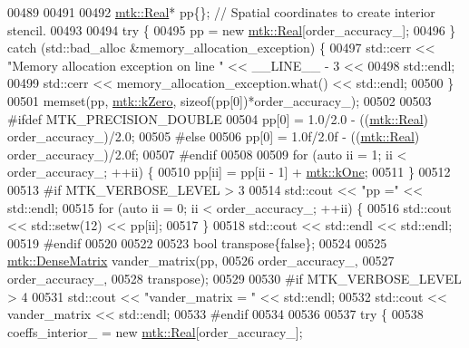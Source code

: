 \begin{DoxyCode}
{{00489 
00491 
00492   \hyperlink{group__c01-roots_gac080bbbf5cbb5502c9f00405f894857d}{mtk::Real}* pp\{\}; \textcolor{comment}{// Spatial coordinates to create interior stencil.}
00493 
00494   \textcolor{keywordflow}{try} \{
00495     pp = \textcolor{keyword}{new} \hyperlink{group__c01-roots_gac080bbbf5cbb5502c9f00405f894857d}{mtk::Real}[order\_accuracy\_];
00496   \} \textcolor{keywordflow}{catch} (std::bad\_alloc &memory\_allocation\_exception) \{
00497     std::cerr << \textcolor{stringliteral}{"Memory allocation exception on line "} << \_\_LINE\_\_ - 3 <<
00498       std::endl;
00499     std::cerr << memory\_allocation\_exception.what() << std::endl;
00500   \}
00501   memset(pp, \hyperlink{group__c01-roots_ga59a451a5fae30d59649bcda274fea271}{mtk::kZero}, \textcolor{keyword}{sizeof}(pp[0])*order\_accuracy\_);
00502 
00503 \textcolor{preprocessor}{  #ifdef MTK\_PRECISION\_DOUBLE}
00504   pp[0] = 1.0/2.0 - ((\hyperlink{group__c01-roots_gac080bbbf5cbb5502c9f00405f894857d}{mtk::Real}) order\_accuracy\_)/2.0;
00505 \textcolor{preprocessor}{  #else}
00506   pp[0] = 1.0f/2.0f - ((\hyperlink{group__c01-roots_gac080bbbf5cbb5502c9f00405f894857d}{mtk::Real}) order\_accuracy\_)/2.0f;
00507 \textcolor{preprocessor}{  #endif}
00508 
00509   \textcolor{keywordflow}{for} (\textcolor{keyword}{auto} ii = 1; ii < order\_accuracy\_; ++ii) \{
00510     pp[ii] = pp[ii - 1] + \hyperlink{group__c01-roots_ga26407c24d43b6b95480943340d285c71}{mtk::kOne};
00511   \}
00512 
00513 \textcolor{preprocessor}{  #if MTK\_VERBOSE\_LEVEL > 3}
00514   std::cout << \textcolor{stringliteral}{"pp ="} << std::endl;
00515   \textcolor{keywordflow}{for} (\textcolor{keyword}{auto} ii = 0; ii < order\_accuracy\_; ++ii) \{
00516     std::cout << std::setw(12) << pp[ii];
00517   \}
00518   std::cout << std::endl << std::endl;
00519 \textcolor{preprocessor}{  #endif}
00520 
00522 
00523   \textcolor{keywordtype}{bool} transpose\{\textcolor{keyword}{false}\};
00524 
00525   \hyperlink{classmtk_1_1DenseMatrix}{mtk::DenseMatrix} vander\_matrix(pp,
00526                                  order\_accuracy\_,
00527                                  order\_accuracy\_,
00528                                  transpose);
00529 
00530 \textcolor{preprocessor}{  #if MTK\_VERBOSE\_LEVEL > 4}
00531   std::cout << \textcolor{stringliteral}{"vander\_matrix = "} << std::endl;
00532   std::cout << vander\_matrix << std::endl;
00533 \textcolor{preprocessor}{  #endif}
00534 
00536 
00537   \textcolor{keywordflow}{try} \{
00538     coeffs\_interior\_ = \textcolor{keyword}{new} \hyperlink{group__c01-roots_gac080bbbf5cbb5502c9f00405f894857d}{mtk::Real}[order\_accuracy\_];
}}
\end{DoxyCode}
